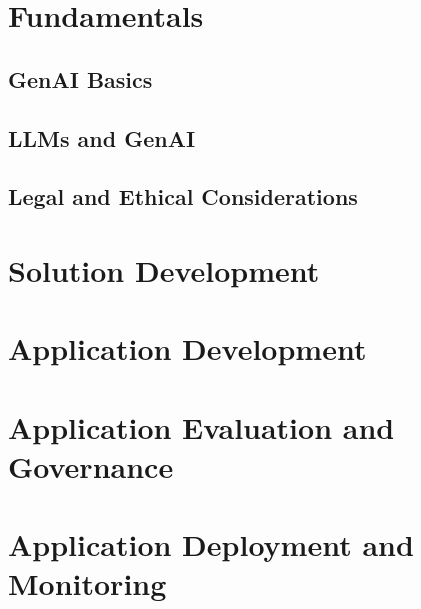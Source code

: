 \documentclass[11pt]{scrartcl}
\begin{document}
\tableofcontents

\newpage
\section{Fundamentals}
\subsection{GenAI Basics}

\subsection{LLMs and GenAI}

\subsection{Legal and Ethical Considerations}


\newpage
\section{Solution Development}


\newpage
\section{Application Development}


\newpage
\section{Application Evaluation and Governance}


\newpage
\section{Application Deployment and Monitoring}
\end{document}
